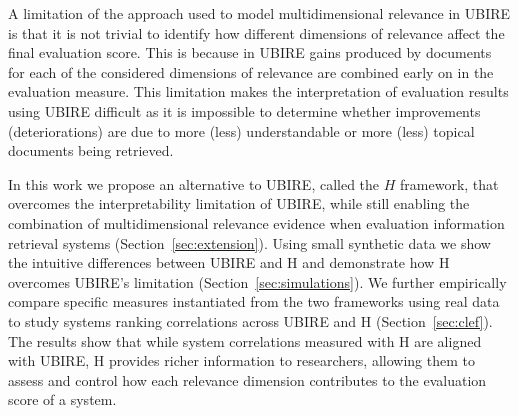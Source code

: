 
A limitation of the approach used to model multidimensional relevance in UBIRE is that it is not trivial to identify how different dimensions of relevance affect the final evaluation score. This is because in UBIRE gains produced by documents for each of the considered dimensions of relevance are combined early on in the evaluation measure. This limitation makes the interpretation of evaluation results using UBIRE difficult as it is impossible to determine whether improvements (deteriorations) are due to more (less) understandable or more (less) topical documents being retrieved. 

In this work we propose an alternative to UBIRE, called the $H$ framework, that overcomes the interpretability limitation of UBIRE, while still enabling the combination of multidimensional relevance evidence when evaluation information retrieval systems (Section~\ref{sec:extension}). Using small synthetic data we show the intuitive differences between UBIRE and H and demonstrate how H overcomes UBIRE's limitation (Section~\ref{sec:simulations}). We further empirically compare specific measures instantiated from the two frameworks using real data to study systems ranking correlations across UBIRE and H (Section~\ref{sec:clef}). The results show that while system correlations measured with H are aligned with UBIRE, H provides richer information to researchers, allowing them to assess and control how each relevance dimension contributes
to the evaluation score of a system.


